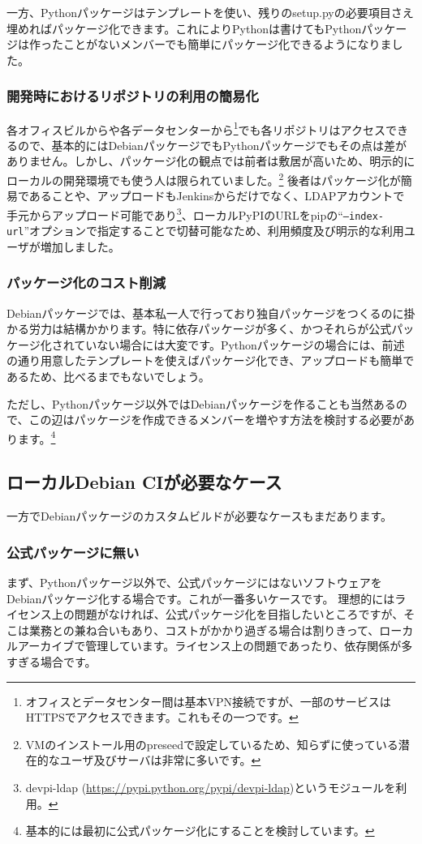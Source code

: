 \documentclass[mingoth,a4paper]{jsarticle}
\begin{document}
一方、Pythonパッケージはテンプレートを使い、残りのsetup.pyの必要項目さえ埋めればパッケージ化できます。これによりPythonは書けてもPythonパッケージは作ったことがないメンバーでも簡単にパッケージ化できるようになりました。

\subsubsection{開発時におけるリポジトリの利用の簡易化}
各オフィスビルからや各データセンターから\footnote{オフィスとデータセンター間は基本VPN接続ですが、一部のサービスはHTTPSでアクセスできます。これもその一つです。}でも各リポジトリはアクセスできるので、基本的にはDebianパッケージでもPythonパッケージでもその点は差がありません。しかし、パッケージ化の観点では前者は敷居が高いため、明示的にローカルの開発環境でも使う人は限られていました。\footnote{VMのインストール用のpreseedで設定しているため、知らずに使っている潜在的なユーザ及びサーバは非常に多いです。}
後者はパッケージ化が簡易であることや、アップロードもJenkinsからだけでなく、LDAPアカウントで手元からアップロード可能であり\footnote{devpi-ldap (\url{https://pypi.python.org/pypi/devpi-ldap})というモジュールを利用。}、ローカルPyPIのURLをpipの``\texttt{--index-url}''オプションで指定することで切替可能なため、利用頻度及び明示的な利用ユーザが増加しました。

\subsubsection{パッケージ化のコスト削減}

Debianパッケージでは、基本私一人で行っており独自パッケージをつくるのに掛かる労力は結構かかります。特に依存パッケージが多く、かつそれらが公式パッケージ化されていない場合には大変です。Pythonパッケージの場合には、前述の通り用意したテンプレートを使えばパッケージ化でき、アップロードも簡単であるため、比べるまでもないでしょう。

ただし、Pythonパッケージ以外ではDebianパッケージを作ることも当然あるので、この辺はパッケージを作成できるメンバーを増やす方法を検討する必要があります。\footnote{基本的には最初に公式パッケージ化にすることを検討しています。}

\subsection{ローカルDebian CIが必要なケース}
一方でDebianパッケージのカスタムビルドが必要なケースもまだあります。

\subsubsection{公式パッケージに無い}
まず、Pythonパッケージ以外で、公式パッケージにはないソフトウェアをDebianパッケージ化する場合です。これが一番多いケースです。
理想的にはライセンス上の問題がなければ、公式パッケージ化を目指したいところですが、そこは業務との兼ね合いもあり、コストがかかり過ぎる場合は割りきって、ローカルアーカイブで管理しています。ライセンス上の問題であったり、依存関係が多すぎる場合です。
\end{document}
